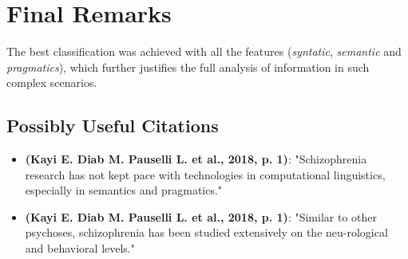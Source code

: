 \documentclass{Paper_Summary}
\begin{document}
\section{Final Remarks}
    
    The best classification was achieved with all the features (\emph{syntatic}, \emph{semantic} and \emph{pragmatics}), which further justifies the full analysis of information in such complex scenarios.

\breakline

\begin{center}
    \section*{Possibly Useful Citations}
\end{center}

    \begin{itemize}
        \item \textbf{(Kayi E. Diab M. Pauselli L. et al., 2018, p. 1)}: "Schizophrenia research has not kept pace with technologies in computational linguistics, especially in semantics and pragmatics."
        \item \textbf{(Kayi E. Diab M. Pauselli L. et al., 2018, p. 1)}: "Similar to other psychoses, schizophrenia has been studied extensively on the neu-rological and behavioral levels."
    \end{itemize}
\end{document}
